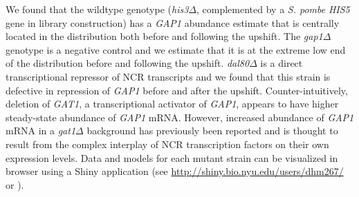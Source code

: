
We found that the wildtype
genotype (\textit{his3}$\Delta$, complemented by a \textit{S. pombe} 
\textit{HIS5} gene in library construction) 
has a \textit{GAP1} abundance estimate that is centrally
located in the distribution both before and following the upshift. The
\textit{gap1}$\Delta$ genotype is a negative control and 
we estimate that it is at the extreme
low end of the distribution before and following the upshift. 
\textit{dal80}$\Delta$ is a direct transcriptional repressor
of NCR transcripts %
and we found that this strain is defective in
repression of \textit{GAP1} before and after the upshift. 
Counter-intuitively, deletion of \textit{GAT1}, a transcriptional activator
of \textit{GAP1}, appears to have higher steady-state abundance of
\textit{GAP1} mRNA.
However, increased abundance of \textit{GAP1} mRNA in a
\textit{gat1}$\Delta$ background has
previously been reported \parencite{scherens2006identification} and is thought to
result from the complex interplay of NCR transcription factors on
their own expression levels. 
Data and models for each mutant strain can be visualized in browser
using a Shiny application (see
\url{http://shiny.bio.nyu.edu/users/dhm267/} or ). 




